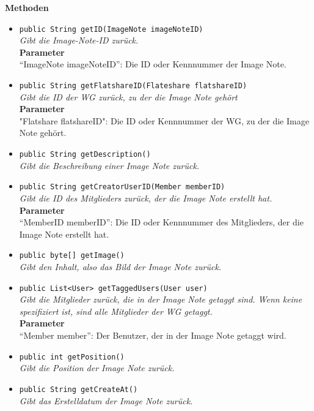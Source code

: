 	\textbf{Methoden}
	\begin{itemize}
		\item\texttt{{public String getID(ImageNote imageNoteID)}}\\
		\textit{Gibt die Image-Note-ID zurück.}\\
		\textbf{Parameter}\\
		“ImageNote imageNoteID”: Die ID oder Kennnummer der Image Note.\\
		
		\item\texttt{{public String getFlatshareID(Flateshare flatshareID)}}\\
		\textit{Gibt die ID der WG zurück, zu der die Image Note gehört}\\
		\textbf{Parameter}\\
		"Flatshare flatshareID": Die ID oder Kennnummer der WG, zu der die Image Note gehört.
		
		\item\texttt{{public String getDescription()}}\\
		\textit{Gibt die Beschreibung einer Image Note zurück.}\\
		
		\item\texttt{{public String getCreatorUserID(Member memberID)}}\\
		\textit{Gibt die ID des Mitglieders zurück, der die Image Note erstellt hat.}\\
		\textbf{Parameter}\\
		“MemberID memberID”: Die ID oder Kennnummer des Mitglieders, der die Image Note erstellt hat.\\
		
		\item\texttt{{public byte[] getImage()}}\\
		\textit{Gibt den Inhalt, also das Bild der Image Note zurück.}\\
		
		\item\texttt{{public List<User> getTaggedUsers(User user)}}\\
		\textit{Gibt die Mitglieder zurück, die in der Image Note getaggt sind. Wenn keine spezifiziert ist, sind alle Mitglieder der WG getaggt.}\\
		\textbf{Parameter}\\
		“Member member”: Der Benutzer, der in der Image Note getaggt wird.\\
		
		\item\texttt{{public int getPosition()}}\\
		\textit{Gibt die Position der Image Note zurück.}\\
		
		\item\texttt{{public String getCreateAt()}}\\
		\textit{Gibt das Erstelldatum der Image Note zurück.}\\
	\end{itemize}

